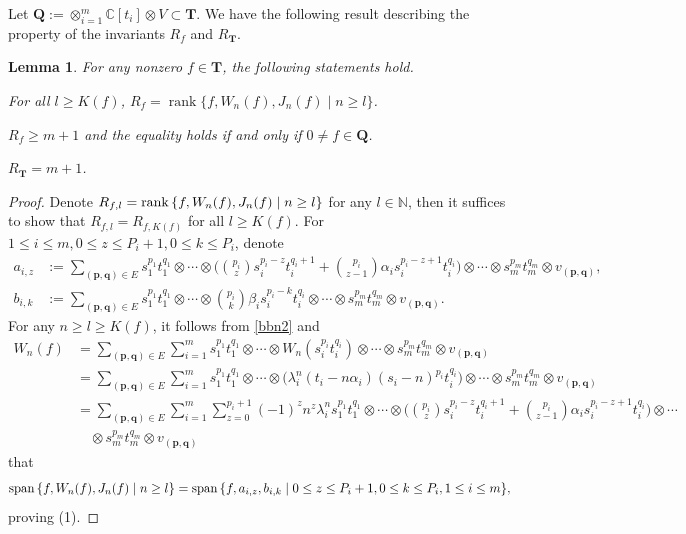 \documentclass[12pt,leqno,amscd,amsfonts,amssymb]{amsart}
\def\a{\alpha}
\def\b{\beta}
\def\N{\mathbb{N}}
\def\C{\mathbb{C}}
\numberwithin{equation}{section}
\newtheorem{lemm}[theo]{Lemma}
\begin{document}
Let $\bm{Q}:=\otimes_{i=1}^m\C[t_i]\otimes V\subset \bm{T}$. We have the following result describing the property of the invariants $R_{f}$ and $R_{\bm{T}}$.
\begin{lemm}\label{theoo5}
For any nonzero $f\in \bm{T}$, the following statements hold.
\begin{trivlist}
\item[(1)]For all $l\geq K(f)$, $R_f=\operatorname{rank} \{f,  W_n(f), J_n(f)\mid n\ge l\}$.
\item[(2)]$R_f\geq m+1$ and the equality holds if and only if  $0\neq f\in \bm{Q}$.
\item[(3)]$R_{\bm{T}}=m+1$.
\end{trivlist}
\end{lemm}
\begin{proof}
Denote $R_{f, l}= {\rm rank\,}\{f, W_n(f), J_n(f)\mid n\geq l\}$ for any $l\in\N$, then it suffices to show that $R_{f, l}=R_{f, K(f)}$ for all $l\geq K(f)$. For $1\leq i \leq m, 0\leq z \leq P_i+1, 0\leq k \leq P_i$, denote
\begin{align*}a_{i,z}&:=\sum_{(\mathbf{p}, \mathbf{q})\in E}s_1^{p_1} t_1^{q_1}\otimes\cdots\otimes\big(\binom{p_i}{z} s_i^{p_{i}-z} t_i^{q_i+1}+ \binom{p_i}{z-1} \a_i s_i^{p_i -z +1}t_i^{q_i}\big)\otimes\cdots\otimes s_m^{p_m}t_m^{q_m}\otimes v_{(\mathbf{p}, \mathbf{q})},\\
b_{i,k}&:=\sum_{(\mathbf{p}, \mathbf{q})\in E}s_1^{p_1} t_1^{q_1}\otimes\cdots\otimes\binom{p_i}{k}\b_i s_i^{p_{i}-k} t_i^{q_i}\otimes\cdots\otimes s_m^{p_m}t_m^{q_m}\otimes v_{(\mathbf{p}, \mathbf{q})}.
\end{align*}
For any $n\geq l\geq K(f)$, it follows from \eqref{bbn2} and
\begin{align*}
W_n(f)&=\sum_{(\mathbf{p}, \mathbf{q})\in E}\sum_{i=1}^ms_1^{p_1}t_1^{q_1}\otimes\cdots \otimes W_n(s_i^{p_{i}}t_i^{q_i})\otimes\cdots\otimes s_m^{p_m}t_m^{q_m}\otimes v_{(\mathbf{p}, \mathbf{q})}\nonumber\\
&=\sum_{(\mathbf{p}, \mathbf{q})\in E}\sum_{i=1}^ms_1^{p_1}t_1^{q_1}\otimes\cdots \otimes \big(\lambda_i^n(t_i-n\a_i)(s_i-n)^{p_i} t_i^{q_i}\big)\otimes\cdots\otimes s_m^{p_m}t_m^{q_m}\otimes v_{(\mathbf{p}, \mathbf{q})}\nonumber\\
&=\sum_{(\mathbf{p}, \mathbf{q})\in E}\sum_{i=1}^{m}\sum_{z=0}^{p_i+1}(-1)^z n^z\lambda_i^n s_1^{p_1} t_1^{q_1}\otimes\cdots\otimes\big(\binom{p_i}{z} s_i^{p_{i}-z} t_i^{q_i+1} + \binom{p_i}{z-1} \a_i s_i^{p_i -z+1}t_i^{q_i}\big)\otimes\cdots\nonumber\\
&\quad\otimes s_m^{p_m}t_m^{q_m}\otimes v_{(\mathbf{p}, \mathbf{q})}
\end{align*}
that 
$${\rm span\,}\{f, W_n(f), J_n(f)\mid n\geq l\}={\rm span\,}\{f, a_{i, z}, b_{i, k}\mid 0\leq z\leq  P_i+1, 0\leq k \leq P_i, 1\leq i \leq m\},$$
proving (1).


\end{proof}
\end{document}

